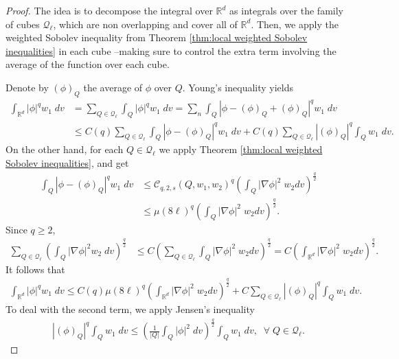 \documentclass[12pt,american]{amsart}
\numberwithin{equation}{section}
\theoremstyle{plain}
\theoremstyle{definition}                  %
\begin{document}
\begin{proof}
  The idea is to decompose the integral over $\mathbb{R}^d$ as integrals over the family of cubes $\mathcal{Q}_{\ell}$, which are non overlapping and cover all of $\mathbb{R}^d$. Then, we apply the weighted Sobolev inequality from Theorem \ref{thm:local weighted Sobolev inequalities} in each cube --making sure to control the extra term involving the average of the function over each cube. 
  
  Denote by $(\phi)_{Q}$ the average of $\phi$ over $Q$. Young's inequality yields
  \begin{align*}	
    \int_{\mathbb{R}^d}|\phi|^qw_1\;dv & = \sum \limits_{Q\in\mathcal{Q}_\ell} \int_{Q}|\phi|^qw_1\;dv  = \sum \limits_{n} \int_{Q}|\phi-(\phi)_{Q}+(\phi)_{Q} |^qw_1\;dv \\
	  & \leq C(q)\sum \limits_{Q\in\mathcal{Q}_{\ell}} \int_{Q}|\phi-(\phi)_{Q}|^qw_1\;dv+C(q)\sum \limits_{Q\in\mathcal{Q}_\ell} |(\phi)_{Q}|^q \int_{Q}w_1\;dv. 	
  \end{align*}
  On the other hand, for each $Q\in\mathcal{Q}_\ell$ we apply Theorem \ref{thm:local weighted Sobolev inequalities}, and get 
  \begin{align*}
    \int_{Q}|\phi-(\phi)_{Q}|^qw_1\;dv & \leq \mathcal{C}_{q,2,s}(Q,w_1,w_2)^q\left ( \int_{Q} |\nabla \phi|^2\;w_2 dv \right )^{\frac{q}{2}}\\
	& \leq \mu(8\ell)^q \left ( \int_{Q} |\nabla \phi|^2\;w_2 dv \right )^{\frac{q}{2}}.
  \end{align*}	
  Since $q\geq 2$,  
  \begin{align*}
    \sum \limits_{Q\in\mathcal{Q}_\ell}\left ( \int_{Q} |\nabla \phi|^2 w_2\;dv \right )^{\frac{q}{2}} & \leq C \left (\sum\limits_{Q\in\mathcal{Q}_\ell} \int_{Q}|\nabla \phi|^2\;w_2 dv \right )^{\frac{q}{2}} = C \left (\int_{\mathbb{R}^d}|\nabla \phi|^2\;w_2 dv \right )^{\frac{q}{2}}.	  
  \end{align*}	
  It follows that
  \begin{align*}
    \int_{\mathbb{R}^d}|\phi|^qw_1\;dv\leq C(q)\mu(8\ell)^q\left (\int_{\mathbb{R}^d}|\nabla \phi|^2\;w_2 dv \right )^{\frac{q}{2}}+C\sum \limits_{Q\in\mathcal{Q}_\ell} |(\phi)_{Q}|^q \int_{Q}w_1\;dv .	  	  
  \end{align*}	  
  To deal with the second term, we apply Jensen's inequality
  \begin{align*}  
|(\phi)_{Q}|^q   \int_{Q}w_1\;dv  \leq \left( \frac{1}{|Q|}\int_{Q}|\phi|^2\;dv \right )^{\frac{q}{2}}\int_{Q}w_1\;dv ,\;\;\forall\;Q\in\mathcal{Q}_\ell.

\end{align*}
\end{proof}
\end{document}
